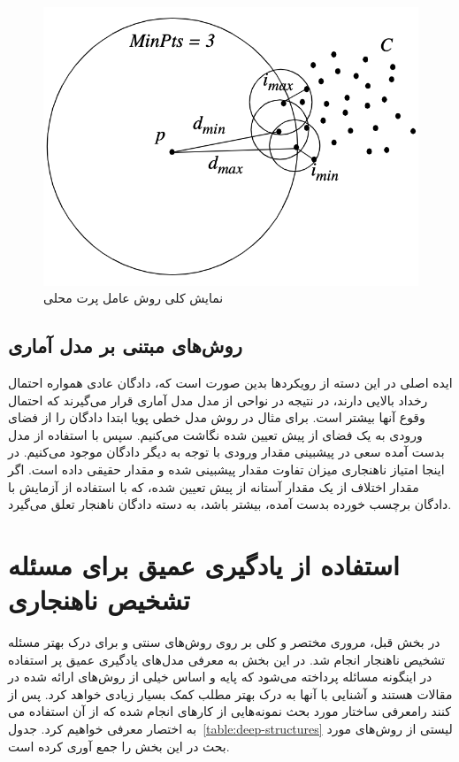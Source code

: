 \documentclass[12pt,a4paper]{report}
\theoremstyle{definition}
\theoremstyle{definition}
\begin{document}
	\begin{figure}[!h]
	\begin{center}
		\includegraphics[width=0.5\linewidth]{./images/figures/lof.png}
	\end{center}
	\caption{نمایش کلی روش عامل پرت محلی~\cite{10.1145/342009.335388}}
	\label{fig:lof}
	\centering
\end{figure}



\subsection{روش‌های مبتنی بر مدل آماری}
ایده اصلی در این دسته از رویکرد‌ها بدین صورت است که، دادگان عادی همواره احتمال رخداد بالایی دارند، در نتیجه در نواحی از مدل مدل آماری قرار می‌گیرند که احتمال وقوع آنها بیشتر است. برای مثال در روش مدل خطی پویا ابتدا دادگان را از فضای ورودی به یک فضای از پیش تعیین شده نگاشت می‌کنیم. سپس با استفاده از مدل بدست آمده سعی در پیشبینی مقدار ورودی با توجه به دیگر دادگان موجود می‌کنیم. در اینجا امتیاز ناهنجاری میزان تفاوت مقدار پیشبینی شده و مقدار حقیقی داده است. اگر مقدار اختلاف از یک مقدار آستانه از پیش تعیین شده، که با استفاده از آزمایش با دادگان برچسب خورده بدست آمده، بیشتر باشد، به دسته دادگان ناهنجار تعلق می‌گیرد.


\section{استفاده از یادگیری عمیق برای مسئله تشخیص ناهنجاری}
 در بخش قبل، مروری مختصر و کلی بر روی روش‌های سنتی و برای درک بهتر مسئله تشخیص ناهنجار انجام شد. در این بخش به معرفی مدل‌های یادگیری عمیق پر استفاده در اینگونه مسائله پرداخته می‌شود که پایه و اساس خیلی از روش‌های ارائه شده در مقالات هستند و آشنایی با آنها به درک بهتر مطلب کمک بسیار زیادی خواهد کرد. پس از معرفی ساختار مورد بحث نمونه‌هایی از کار‌های انجام شده که از آن استفاده می‌‎کنند را به اختصار معرفی خواهیم کرد. جدول~\ref{table:deep-structures} لیستی از روش‌های مورد بحث در این بخش را جمع آوری کرده است.
\end{document}
